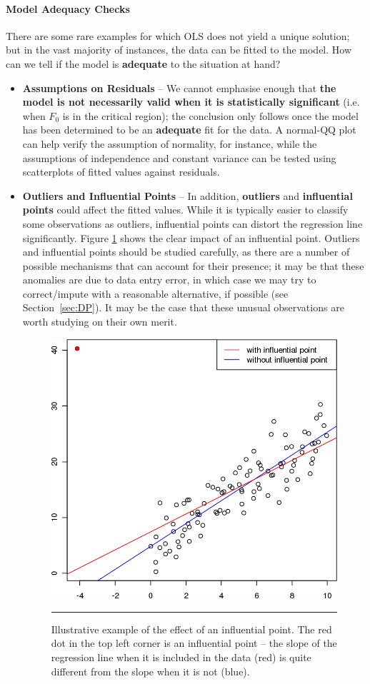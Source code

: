\paragraph{Model Adequacy Checks} There are some rare examples for which OLS does not yield a unique solution; but in the vast majority of instances, the data can be fitted to the model. How can we tell if the model is \textbf{adequate} to the situation at hand? 
\begin{itemize}
\item \textbf{Assumptions on Residuals} -- We cannot emphasise enough that \textbf{the model is not necessarily valid when it is statistically significant} (i.e. when $F_0$ is in the critical region); the conclusion only follows once the model has been determined to be an \textbf{adequate} fit for the data. A normal-QQ plot can help verify the assumption of normality, for instance, while the assumptions of independence and constant variance can be tested using scatterplots of fitted values against residuals.

\item \textbf{Outliers and Influential Points} -- In addition, \textbf{outliers} and \textbf{influential points} could affect the fitted values. While it is typically easier to classify some observations as outliers, influential points can distort the regression line significantly. Figure \ref{fig:testA5} shows the clear impact of an influential point. Outliers and influential points should be studied carefully, as there are a number of possible mechanisms that can account for their presence; it may be that these anomalies are due to data entry error, in which case we may try to correct/impute with a reasonable alternative, if possible (see Section~\ref{sec:DP}). It may be the case that these unusual observations are worth studying on their own merit.

\begin{figure}[!t]
\centering
  \includegraphics[width=0.5\linewidth]{images/SA/testA5.png}
  \caption[\small Illustrative example of the effect of an influential point]{\small Illustrative example of the effect of an influential point. The red dot in the top left corner is an influential point -- the slope of the  regression line when it is included in the data (red) is quite different from the slope when it is not (blue).}
  \label{fig:testA5}\hrule
\end{figure}


\end{itemize}

